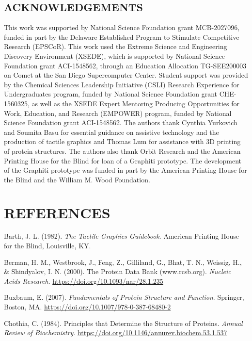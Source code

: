 \documentclass[11.5pt]{sig-alternate} %
\begin{document}
\begin{large}
\section*{ACKNOWLEDGEMENTS}

This work was supported by National Science Foundation grant MCB-2027096, funded in part by the Delaware Established Program to Stimulate Competitive Research (EPSCoR). This work used the Extreme Science and Engineering Discovery Environment (XSEDE), which is supported by National Science Foundation grant ACI-1548562, through an Education Allocation TG-SEE200003 on Comet at the San Diego Supercomputer Center. Student support was provided by the Chemical Sciences Leadership Initiative (CSLI) Research Experience for Undergraduates program, funded by National Science Foundation grant CHE-1560325, as well as the XSEDE Expert Mentoring Producing Opportunities for Work, Education, and Research (EMPOWER) program, funded by National Science Foundation grant ACI-1548562. The authors thank Cynthia Yurkovich and Soumita Basu for essential guidance on assistive technology and the production of tactile graphics and Thomas Lum for assistance with 3D printing of protein structures. The authors also thank Orbit Research and the American Printing House for the Blind for loan of a Graphiti prototype. The development of the Graphiti prototype was funded in part by the American Printing House for the Blind and the William M. Wood Foundation.

\end{large}
\clearpage
\section*{REFERENCES}\par 

\leftskip 0.25in
\parindent -0.25in 
Barth, J. L. (1982). \textit{The Tactile Graphics Guidebook}. American Printing House for the Blind, Louisville, KY.

Berman, H. M., Westbrook, J., Feng, Z., Gilliland, G., Bhat, T. N., Weissig, H., \& Shindyalov, I. N. (2000). The Protein Data Bank (www.rcsb.org). \textit{Nucleic Acids Research}. \url{https://doi.org/10.1093/nar/28.1.235}

Buxbaum, E. (2007). \textit{Fundamentals of Protein Structure and Function}. Springer, Boston, MA. \url{https://doi.org/10.1007/978-0-387-68480-2}

Chothia, C. (1984). Principles that Determine the Structure of Proteins. \textit{Annual Review of Biochemistry}. \url{https://doi.org/10.1146/annurev.biochem.53.1.537}
\end{document}
